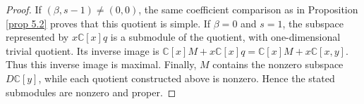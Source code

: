 \documentclass[12pt,reqno]{amsart}
\numberwithin{equation}{section}
\begin{document}
\begin{proof}
 
 
 
 
 
 If $(\beta,s-1)\ne(0,0)$, the same coefficient comparison as in Proposition \ref{prop 5.2} proves that this quotient is simple.
If $\beta=0$ and $s=1$, the subspace represented by $x\mathbb C[x]q$ is a submodule of the quotient, with one-dimensional trivial quotient. Its inverse image is
$\mathbb C[x]M+x\mathbb C[x]q
=\mathbb C[x]M+x\mathbb C[x,y]$.
Thus this inverse image is maximal.
Finally, $M$ contains the nonzero subspace $D\mathbb C[y]$, while each quotient constructed above is nonzero. Hence the stated submodules are nonzero and proper. 






    
\end{proof}
\end{document}
